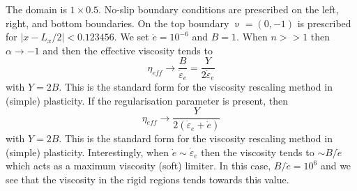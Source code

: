 The domain is $1\times0.5$. No-slip boundary conditions are prescribed on the left, right, and bottom 
boundaries. On the top boundary $\upnu=(0,-1)$ is prescribed for $|x-L_x/2|<0.123456$.
We set $\dot{e}=10^{-6}$ and $B=1$.
When $n >> 1$ then $\alpha \rightarrow -1$ and then the effective viscosity tends to 
\[
\eta_{eff} \rightarrow 
\frac{B}{\dot\varepsilon_e}
=
\frac{Y}{2\dot\varepsilon_e}
\] 
with $Y=2B$. This is the standard form for the viscosity rescaling method in (simple) plasticity.
If the regularisation parameter is present, then 
\[
\eta_{eff} \rightarrow 
\frac{Y}{2(\dot\varepsilon_e + \dot{e})}
\] 
with $Y=2B$. This is the standard form for the viscosity rescaling method in (simple) plasticity.
Interestingly, when $\dot{e} \sim \dot\varepsilon_e$ then the 
viscosity tends to $\sim B/\dot{e}$ which acts as a maximum viscosity (soft) limiter.
In this case, $B/\dot{e}=10^6$ and we see that the viscosity in the rigid regions tends towards this value.


